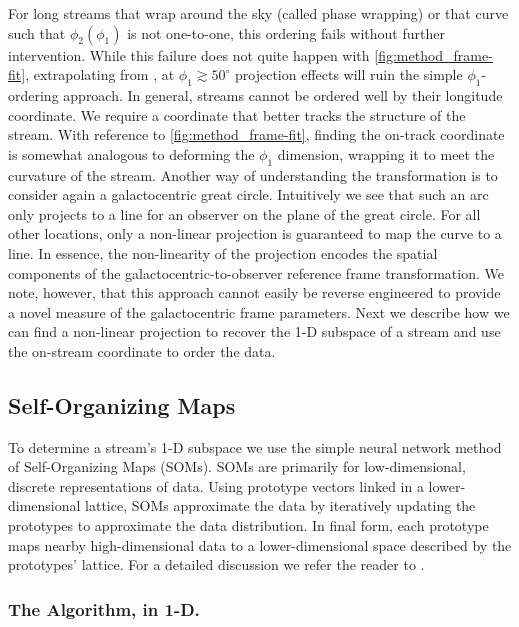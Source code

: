 \documentclass[fleqn,usenatbib]{mnras}
\begin{document}
    For long streams that wrap around the sky (called phase wrapping) or that
    curve such that $\phi_2(\phi_1)$ is not one-to-one, this ordering fails
    without further intervention. While this failure does not quite happen with
    \autoref{fig:method_frame-fit}, extrapolating from , at
    $\phi_1 \gtrsim 50^\circ$ projection effects will ruin the simple
    $\phi_1$-ordering approach. In general, streams cannot be ordered well by
    their longitude coordinate. We require a coordinate that better tracks the
    structure of the stream. With reference to \autoref{fig:method_frame-fit},
    finding the on-track coordinate is somewhat analogous to deforming the
    $\phi_1$ dimension, wrapping it to meet the curvature of the stream. Another
    way of understanding the transformation is to consider again a
    galactocentric great circle. Intuitively we see that such an arc only
    projects to a line for an observer on the plane of the great circle. For all
    other locations, only a non-linear projection is guaranteed to map the curve
    to a line. In essence, the non-linearity of the projection encodes the
    spatial components of the galactocentric-to-observer reference frame
    transformation. We note, however, that this approach cannot easily be
    reverse engineered to provide a novel measure of the galactocentric frame
    parameters. Next we describe how we can find a non-linear projection to
    recover the 1-D subspace of a stream and use the on-stream coordinate to
    order the data.


  \subsection{Self-Organizing Maps} \label{sub:self_organizing_maps}

    To determine a stream's 1-D subspace we use the simple neural network method
    of Self-Organizing Maps (SOMs). SOMs are primarily for low-dimensional,
    discrete representations of data. Using prototype vectors linked in a
    lower-dimensional lattice, SOMs approximate the data by iteratively updating
    the prototypes to approximate the data distribution. In final form, each
    prototype maps nearby high-dimensional data to a lower-dimensional space
    described by the prototypes' lattice. For a detailed discussion we refer the
    reader to \cite{DataScience}.


    \subsubsection{The Algorithm, in 1-D.} \label{ssub:som_math_overview}
\end{document}
